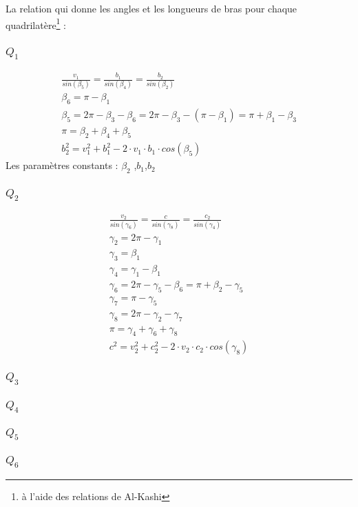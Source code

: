 \documentclass[12pt,a4paper]{article}
\begin{document}
La relation qui donne les angles et les longueurs de bras pour chaque quadrilatère\footnote{à l'aide des relations de Al-Kashi} : 

\subsubsection{$Q_1$}
\begin{eqnarray}
\frac{v_1}{sin(\beta_5)}=\frac{b_1}{sin(\beta_4)}=\frac{b_2}{sin(\beta_2)}\\
\beta_6=\pi-\beta_1\\
\beta_5=2\pi-\beta_3-\beta_6=2\pi-\beta_3-(\pi-\beta_1)=\pi+\beta_1-\beta_3\\
\pi=\beta_2+\beta_4+\beta_5\\
b_2^2=v_1^2+b_1^2- 2 \cdot v_1 \cdot b_1 \cdot cos(\beta_5)
\end{eqnarray}
Les paramètres constants : $\beta_2$ ,$b_1$,$b_2$
\subsubsection{$Q_2$}
\begin{eqnarray}
\frac{v_2}{sin(\gamma_6)}=\frac{c}{sin(\gamma_8)}=\frac{c_2}{sin(\gamma_4)}\\
\gamma_2=2\pi-\gamma_1\\
\gamma_3=\beta_1\\
\gamma_4=\gamma_1-\beta_1\\
\gamma_6=2\pi-\gamma_5-\beta_6=\pi+\beta_2-\gamma_5\\
\gamma_7=\pi-\gamma_5\\
\gamma_8=2\pi-\gamma_2-\gamma_7\\
\pi=\gamma_4+\gamma_6+\gamma_8\\
c^2=v_2^2+c_2^2- 2 \cdot v_2 \cdot c_2 \cdot cos(\gamma_8)
\end{eqnarray}
\subsubsection{$Q_3$}

\subsubsection{$Q_4$}

\subsubsection{$Q_5$}

\subsubsection{$Q_6$}
\end{document}
